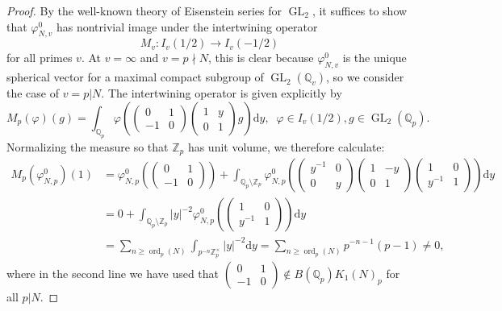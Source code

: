 \documentclass[12pt]{amsart}
\DeclareMathOperator{\ord}{ord}
\theoremstyle{definition}
\newcommand{\Z}{\mathbb{Z}}
\newcommand{\Q}{\mathbb{Q}}
\DeclareMathOperator{\GL}{GL}
\renewcommand{\d}{\mathrm{d}}
\begin{document}
\begin{proof}
    By the well-known theory of Eisenstein series for $\GL_2$, it suffices to show that $\varphi^0_{N,v}$ has nontrivial image under the intertwining operator $$M_v: I_v(1/2) \to I_v(-1/2)$$ for all primes $v$. At $v = \infty$ and $v = p\nmid N$, this is clear because $\varphi^0_{N,v}$ is the unique spherical vector for a maximal compact subgroup of $\GL_2(\Q_v)$, so we consider the case of $v = p |N$. The intertwining operator is given explicitly 
by $$M_p(\varphi)(g) = \int_{\Q_p} \varphi\left(\begin{pmatrix}
     0 & 1 \\ -1 & 0 
\end{pmatrix}\begin{pmatrix}
    1 & y \\ 0 & 1
\end{pmatrix}g\right) \d y,\;\; \varphi\in I_v(1/2), g\in \GL_2(\Q_p).$$
Normalizing the measure so that $\Z_p$ has unit volume, we therefore calculate:
\begin{align*}
    M_p(\varphi^0_{N,p})(1) &=  \varphi^0_{N,p}\left(\begin{pmatrix}
     0 & 1 \\ -1 & 0 
\end{pmatrix}\right) + \int_{\Q_p\setminus \Z_p} 
    \varphi^0_{N,p}\left(\begin{pmatrix}
     y^{-1} & 0 \\ 0 & y\end{pmatrix}
     \begin{pmatrix}
         1 & -y \\ 0 &1
     \end{pmatrix}
     \begin{pmatrix}
         1 & 0 \\ y^{-1} & 1
     \end{pmatrix}\right) \d y \\
&= 0 + \int_{\Q_p\setminus \Z_p} 
   |y|^{-2} \varphi^0_{N,p}\left(\begin{pmatrix}
         1 & 0 \\ y^{-1} & 1
     \end{pmatrix}\right) \d y \\
     &= \sum_{n\geq \ord_p(N)} \int_{p^{-n} \Z_p^\times} |y|^{-2} \d y = 
     \sum_{n \geq \ord_p(N)} p^{-n-1} (p-1)\neq 0,
\end{align*}
where in the second line we have used that $\begin{pmatrix}
    0 & 1 \\ -1 & 0
\end{pmatrix}\not\in B(\Q_p) K_1(N)_p$
for all $p|N$. 
\end{proof}
\end{document}
